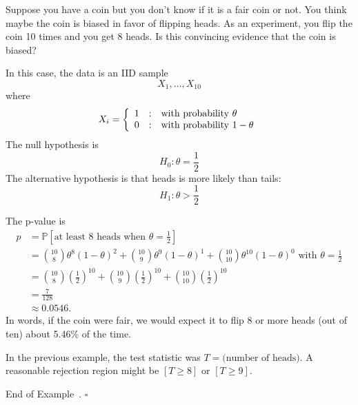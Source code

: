 \documentclass[10pt]{article}
\theoremstyle{definition}
\newtheorem{example}[theorem]{Example}
\renewenvironment{example}
{\begin{oldexample}}
  {\par\smallskip\hfill   End of Example~\theexample. $\square$    \par\end{oldexample}}
\newcommand{\1}[1]{\textbf{1}_{\left[#1\right]}} %
\def\P{\mathbb{P}} %
\begin{document}
\begin{example}
  Suppose you have a coin but you don't know if it is a fair coin or not. You
  think maybe the coin is biased in favor of flipping heads. As an experiment,
  you flip the coin 10 times and you get 8 heads. Is this convincing evidence
  that the coin is biased?

  In this case, the data is an IID sample
  \begin{equation*}
    X_{1},\ldots,X_{10}
  \end{equation*}
  where
  \begin{equation*}
    X_{i}= \left\{ \begin{array}{l@{\quad:\quad}l} 1 & \text{with probability }\theta\\ 0&\text{with probability }1-\theta \end{array}\right.
  \end{equation*}
  The null hypothesis is
  \begin{equation*}
    H_{0}: \theta=\frac{1}{2}
  \end{equation*}
  The alternative hypothesis is that heads is more likely than tails:
  \begin{equation*}
    H_{1}: \theta>\frac{1}{2}
  \end{equation*}

  The p-value is
  \begin{align*}
    p 
    &= \P\left[\text{at least 8 heads when } \theta=\frac{1}{2} \right]\\
    &= {10 \choose 8}\theta^{8}(1-\theta)^{2}+{10 \choose
      9}\theta^{9}(1-\theta)^{1}+{10 \choose 10}\theta^{10}(1-\theta)^{0}
      \text{ with } \theta=\frac{1}{2}\\
    &= {10\choose 8} \left( \frac{1}{2} \right)^{10} +{10\choose 9} \left( \frac{1}{2} \right)^{10} +{10\choose 10} \left( \frac{1}{2} \right)^{10}\\ 
    &= \frac{7}{128}\\
    &\approx 0.0546.
  \end{align*}
  In words, if the coin were fair, we would expect it to flip 8 or more heads
  (out of ten) about 5.46\% of the time.

  
  In the previous example, the test statistic was
  $T=\text{(number of heads)}$. A reasonable rejection region might be
  $\left[ T \geq 8\right]$ or $\left[ T \geq 9\right]$.
\end{example}
\end{document}
